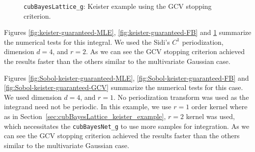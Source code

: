 \documentclass{iitthesis}          %
\newcommand{\code}[1]{\texttt{#1}}
\newcommand\secref{Section~\ref}
\begin{document}
{{{{{{\begin{figure}
	\caption[Lattice: Keister guaranteed: GCV]{\code{cubBayesLattice\_g}: Keister example using the GCV stopping criterion.}
	\label{fig:keister-guaranteed-GCV}
\end{figure}
Figures \ref{fig:keister-guaranteed-MLE}, \ref{fig:keister-guaranteed-FB} and \ref{fig:keister-guaranteed-GCV} summarize the numerical tests for this integral.  We used the Sidi's $C^1$ periodization, dimension $d=4$, and $r=2$. 
As we can see the GCV stopping criterion achieved the results faster than the others similar to the multivariate Gaussian case.

\Subsection{Using \code{cubBayesNet\_g}}
Figures \ref{fig:Sobol-keister-guaranteed-MLE}, \ref{fig:Sobol-keister-guaranteed-FB} and \ref{fig:Sobol-keister-guaranteed-GCV} summarize the numerical tests for this case. We used  dimension $d=4$, and $r=1$.  No periodization transform was used as the integrand need not be periodic. 
In this example, we use $r=1$ order kernel where as in \secref{sec:cubBayesLattice_keister_example}, $r=2$ kernel was used, which necessitates
the \code{cubBayesNet\_g} to use more samples for integration.
As we can see the GCV stopping criterion achieved the results faster than the others similar to the multivariate Gaussian case.

}}}}}}
\end{document}
